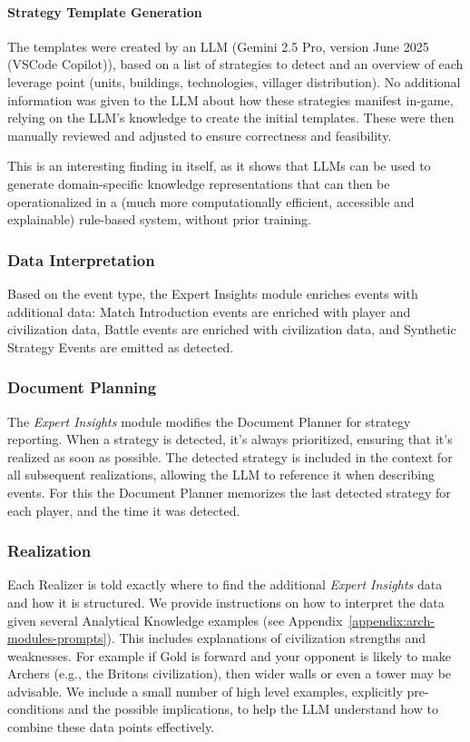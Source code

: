 \paragraph{Strategy Template Generation}
The templates were created by an LLM (Gemini 2.5 Pro, version June 2025 (VSCode Copilot)), based on a list of strategies to detect and an overview of each leverage point (units, buildings, technologies, villager distribution). No additional information was given to the LLM about how these strategies manifest in-game, relying on the LLM's knowledge to create the initial templates. These were then manually reviewed and adjusted to ensure correctness and feasibility.

This is an interesting finding in itself, as it shows that LLMs can be used to generate domain-specific knowledge representations that can then be operationalized in a (much more computationally efficient, accessible and explainable) rule-based system, without prior training.

\subsubsection{Data Interpretation}
Based on the event type, the Expert Insights module enriches events with additional data: Match Introduction events are enriched with player and civilization data, Battle events are enriched with civilization data, and Synthetic Strategy Events are emitted as detected.

\subsubsection{Document Planning}
The \textit{Expert Insights} module modifies the Document Planner for strategy reporting. When a strategy is detected, it's always prioritized, ensuring that it's realized as soon as possible. The detected strategy is included in the context for all subsequent realizations, allowing the LLM to reference it when describing events. For this the Document Planner memorizes the last detected strategy for each player, and the time it was detected.

\subsubsection{Realization}
Each Realizer is told exactly where to find the additional \textit{Expert Insights} data and how it is structured. We provide instructions on how to interpret the data given several Analytical Knowledge examples (see Appendix~\ref{appendix:arch-modules-prompts}). This includes explanations of civilization strengths and weaknesses. For example if Gold is forward and your opponent is likely to make Archers (e.g., the Britons civilization), then wider walls or even a tower may be advisable. We include a small number of high level examples, explicitly pre-conditions and the possible implications, to help the LLM understand how to combine these data points effectively.

